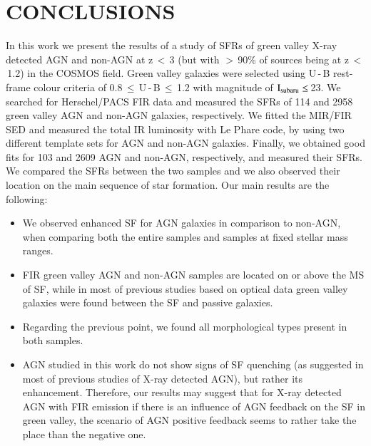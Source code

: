\documentclass[fleqn,usenatbib]{mnras}
\begin{document}
\section{CONCLUSIONS}

In this work we present the results of a study of SFRs of green valley X-ray detected AGN and
non-AGN at z\,$<$\,3 (but with $>$\,90\% of sources being at z\,$<$\,1.2) in the COSMOS field. Green valley galaxies were
selected using U\,-\,B rest-frame colour criteria of 0.8\,$\le$\,U\,-\,B\,$\le$\,1.2 with magnitude of $\rm{I_{subaru}\leq}$\,23. We searched for Herschel/PACS FIR data and measured the SFRs of 114 and 2958 green valley AGN and non-AGN galaxies, respectively. We fitted the MIR/FIR SED and measured the total IR luminosity with Le Phare code, by using two different template sets for AGN and non-AGN galaxies. Finally, we obtained good fits for 103 and 2609 AGN and non-AGN, respectively, and measured their SFRs. We compared the SFRs between the two samples and we also observed their location on the main sequence of star formation. Our main results are the following:
\begin{itemize}
\item We observed enhanced SF for AGN galaxies in comparison to non-AGN, when comparing both the entire samples and samples at fixed stellar mass ranges.
\item FIR green valley AGN and non-AGN samples are located on or above the MS of SF, while in most of previous studies based on optical data green valley galaxies were found between the SF and passive galaxies.
\item Regarding the previous point, we found all morphological types present in both samples.

\item AGN studied in this work do not show signs of SF quenching (as suggested in most of previous studies of X-ray detected AGN), but rather its enhancement. Therefore, our results may suggest that for X-ray detected AGN with FIR emission if there is an influence of AGN feedback on the SF in green valley, the scenario of AGN positive feedback seems to rather take the place than the negative one.
\end{itemize}
\end{document}
